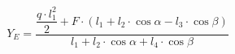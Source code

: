 \documentclass[preview]{standalone}
\begin{document}
\begin{align*}
Y_E  = \dfrac{  \dfrac{q\cdot l_1^2}{2} + F\cdot (l_1+l_2\cdot \cos{\alpha}-l_3\cdot \cos{\beta})  }{  l_1 + l_2\cdot\cos{\alpha} + l_4\cdot\cos{\beta}  }
\end{align*}
\end{document}
